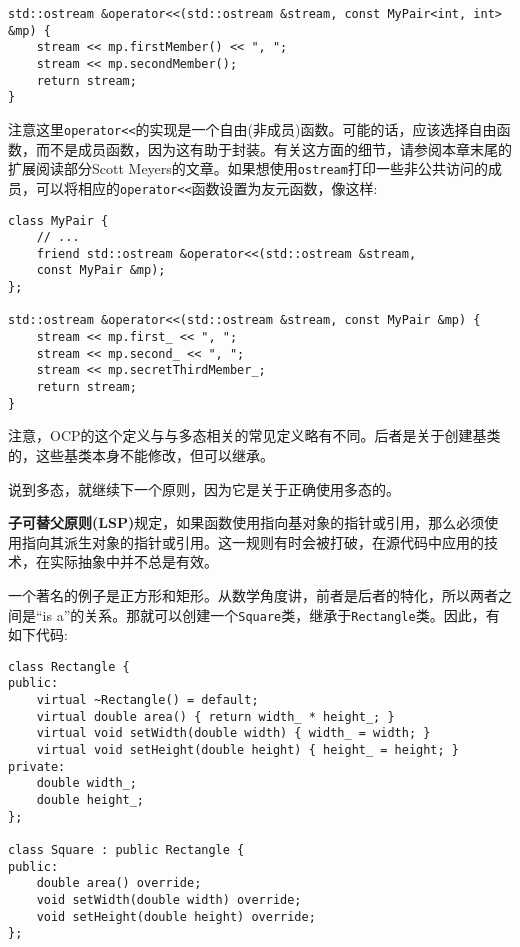 \begin{lstlisting}[style=styleCXX]
std::ostream &operator<<(std::ostream &stream, const MyPair<int, int>
&mp) {
	stream << mp.firstMember() << ", ";
	stream << mp.secondMember();
	return stream;
}

\end{lstlisting}

注意这里\texttt{operator<<}的实现是一个自由(非成员)函数。可能的话，应该选择自由函数，而不是成员函数，因为这有助于封装。有关这方面的细节，请参阅本章末尾的扩展阅读部分Scott Meyers的文章。如果想使用\texttt{ostream}打印一些非公共访问的成员，可以将相应的\texttt{operator<<}函数设置为友元函数，像这样:

\begin{lstlisting}[style=styleCXX]
class MyPair {
	// ...
	friend std::ostream &operator<<(std::ostream &stream,
	const MyPair &mp);
};

std::ostream &operator<<(std::ostream &stream, const MyPair &mp) {
	stream << mp.first_ << ", ";
	stream << mp.second_ << ", ";
	stream << mp.secretThirdMember_;
	return stream;
}
\end{lstlisting}

注意，OCP的这个定义与与多态相关的常见定义略有不同。后者是关于创建基类的，这些基类本身不能修改，但可以继承。

说到多态，就继续下一个原则，因为它是关于正确使用多态的。



\textbf{子可替父原则(LSP)}规定，如果函数使用指向基对象的指针或引用，那么必须使用指向其派生对象的指针或引用。这一规则有时会被打破，在源代码中应用的技术，在实际抽象中并不总是有效。

一个著名的例子是正方形和矩形。从数学角度讲，前者是后者的特化，所以两者之间是“is a”的关系。那就可以创建一个\texttt{Square}类，继承于\texttt{Rectangle}类。因此，有如下代码:

\begin{lstlisting}[style=styleCXX]
class Rectangle {
public:
	virtual ~Rectangle() = default;
	virtual double area() { return width_ * height_; }
	virtual void setWidth(double width) { width_ = width; }
	virtual void setHeight(double height) { height_ = height; }
private:
	double width_;
	double height_;
};

class Square : public Rectangle {
public:
	double area() override;
	void setWidth(double width) override;
	void setHeight(double height) override;
};
\end{lstlisting}

